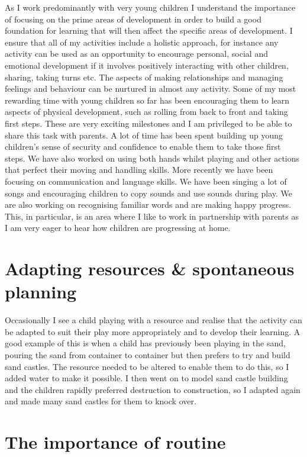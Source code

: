 \documentclass[10pt,a4paper]{report}
\begin{document}
As I work predominantly with very young children I understand the importance of focusing on the prime areas of development in order to build a good foundation for learning that will then affect the specific areas of development. I ensure that all of my activities include a holistic approach, for instance any activity can be used as an opportunity to encourage personal, social and emotional development if it involves positively interacting with other children, sharing, taking turns etc. The aspects of making relationships and managing feelings and behaviour can be nurtured in almost any activity. Some of my most rewarding time with young children so far has been encouraging them to learn aspects of physical development, such as rolling from back to front and taking first steps. These are very exciting milestones and I am privileged to be able to share this task with parents. A lot of time has been spent building up young children's sense of security and confidence to enable them to take those first steps. We have also worked on using both hands whilst playing and other actions that perfect their moving and handling skills. More recently we have been focusing on communication and language skills. We have been singing a lot of songs and encouraging children to copy sounds and use sounds during play. We are also working on recognising familiar words and are making happy progress. This, in particular, is an area where I like to work in partnership with parents as I am very eager to hear how children are progressing at home. 

\section{Adapting resources \& spontaneous planning}

Occasionally I see a child playing with a resource and realise that the activity can be adapted to suit their play more appropriately and to develop their learning. A good example of this is when a child has previously been playing in the sand, pouring the sand from container to container but then prefers to try and build sand castles. The resource needed to be altered to enable them to do this, so I added water to make it possible. I then went on to model sand castle building and the children rapidly preferred destruction to construction, so I adapted again and made many sand castles for them to knock over.

\section{The importance of routine}
\end{document}

